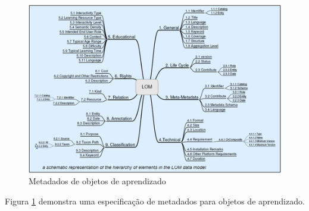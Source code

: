 \documentclass[12pt,openright,oneside,a4paper,english,french,spanish,brazil]{unifil}
\begin{document}
\begin{figure}[htb]
	\centering
	\includegraphics[scale=1.0]{images/lom.png}
	\caption{Metadados de objetos de aprendizado}
	\label{img:lom}
\end{figure}
Figura \ref{img:lom} demonstra uma especificação de metadados para objetos de aprendizado.

\cleardoublepage

\postextual

\end{document}
